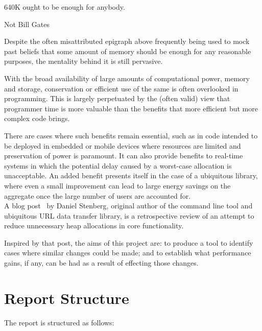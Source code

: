 \epigraph{640K ought to be enough for anybody.}{Not Bill Gates}

Despite the often misattributed epigraph above frequently being used to mock past beliefs that some amount of memory should be enough for any reasonable purposes, the mentality behind it is still pervasive.

With the broad availability of large amounts of computational power, memory and storage, conservation or efficient use of the same is often overlooked in programming. This is largely perpetuated by the (often valid) view that programmer time is more valuable than the benefits that more efficient but more complex code brings.

There are cases where such benefits remain essential, such as in code intended to be deployed in embedded or mobile devices where resources are limited and preservation of power is paramount. It can also provide benefits to real-time systems in which the potential delay caused by a worst-case allocation is unacceptable. An added benefit presents itself in the case of a ubiquitous library, where even a small improvement can lead to large energy savings on the aggregate once the large number of users are accounted for.\\
A blog post~\cite{curlmalloc} by Daniel Stenberg, original author of the  command line tool and ubiquitous URL data transfer library, is a retrospective review of an attempt to reduce unnecessary heap allocations in core functionality.

Inspired by that post, the aims of this project are: to produce a tool to identify cases where similar changes could be made; and to establish what performance gains, if any, can be had as a result of effecting those changes.

\section{Report Structure}

The report is structured as follows:

